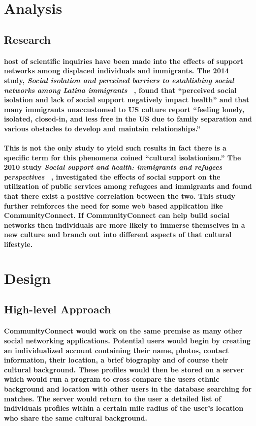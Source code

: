 \documentclass[12pt]{article}
\begin{document}
\section{\bf Analysis}
        \subsection{\bf Research}
                \paragraph{\normalfont \indent host of scientific inquiries have been made into the effects of support networks among displaced individuals and immigrants. The 2014 study, \textit{Social isolation and perceived barriers to establishing social networks among Latina immigrants} ~\cite{Cite1}, found that “perceived social isolation and lack of social support negatively impact health” and  that many immigrants unaccustomed to US culture report “feeling lonely, isolated, closed-in, and less free in the US due to family separation and various obstacles to develop and maintain relationships.”}
                \paragraph{\normalfont \indent This is not the only study to yield such results in fact there is a specific term for this phenomena coined “cultural isolationism.” The 2010 study \textit{Social support and health: immigrants and refugees perspectives} ~\cite{Cite2}, investigated the effects of social support on the utilization of public services among refugees and immigrants and found that there exist a positive correlation between the two. This study further reinforces the need for some web based application like CommunityConnect. If CommunityConnect can help build social networks then individuals are more likely to immerse themselves in a new culture and branch out into different aspects of that cultural lifestyle.}

\section{\bf Design}
        \subsection{\bf High-level Approach}
                \paragraph{\normalfont \indent CommunityConnect would work on the same premise as many other social networking applications. Potential users would begin by creating an individualized account containing their name, photos, contact information, their location, a brief biography and of course their cultural background. These profiles would then be stored on a server which would run a program to cross compare the users ethnic background and location with other users in the database searching for matches. The server would return to the user a detailed list of individuals profiles within a certain mile radius of the user’s location who share the same cultural background.}
\end{document}
